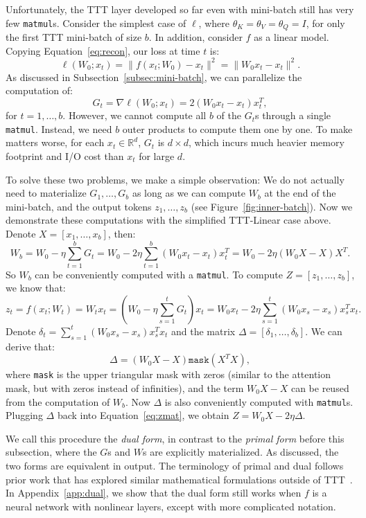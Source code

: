 \documentclass{article}
\newcommand{\R}{\mathbb{R}}
\begin{document}
Unfortunately, the TTT layer developed so far even with mini-batch still has very few \texttt{matmul}s.
Consider the simplest case of $\ell$, where $\theta_K = \theta_V = \theta_Q = I$, for only the first TTT mini-batch of size $b$.
In addition, consider $f$ as a linear model.
Copying Equation~\ref{eq:recon},
our loss at time $t$ is:
$$
\ell\left( W_0; x_t \right) = \|f(x_t; W_0) - x_t\|^2 
= \|W_0 x_t - x_t\|^2.
$$
As discussed in Subsection~\ref{subsec:mini-batch}, we can parallelize the computation of:
$$
G_t = \nabla \ell\left( W_0; x_t \right) = 2(W_0 x_t - x_t)x_t^T,
$$
for $t=1,\dots,b$.
However, we cannot compute all $b$ of the $G_t$s through a single \texttt{matmul}.
Instead, we need $b$ outer products to compute them one by one.
To make matters worse, for each $x_t\in \R^d$, $G_t$ is $d\times d$, which incurs much heavier memory footprint and I/O cost than $x_t$ for large $d$.

To solve these two problems, we make a simple observation: We do not actually need to materialize $G_1, \dots, G_b$ as long as we can compute $W_b$ at the end of the mini-batch, and the output tokens $z_1, \dots, z_b$ (see Figure~\ref{fig:inner-batch}).
Now we demonstrate these computations with the simplified TTT-Linear case above.
Denote $X = [x_1, \dots, x_b]$, then:
$$
W_b = W_0 - \eta\sum_{t=1}^b G_t
= W_0 - 2\eta\sum_{t=1}^b (W_0 x_t - x_t)x_t^T
= W_0 - 2\eta(W_0X - X)X^T.
$$
So $W_b$ can be conveniently computed with a \texttt{matmul}.
To compute $Z = [z_1, \dots, z_b]$, we know that:
\begin{equation}
\label{eq:zmat}
z_t = f(x_t; W_t) = W_tx_t = \left(W_0 - \eta \sum_{s=1}^t G_t\right)x_t
= W_0x_t - 2\eta \sum_{s=1}^t (W_0x_s - x_s)x_s^Tx_t.
\end{equation}
Denote $\delta_t = \sum_{s=1}^t (W_0x_s - x_s)x_s^Tx_t$ and the matrix $\Delta = [\delta_1, \dots, \delta_b]$.
We can derive that:
\begin{equation}
\Delta = \left( W_0X - X \right)\texttt{mask}\left( X^TX \right),
\end{equation}
where \texttt{mask} is the upper triangular mask with zeros (similar to the attention mask, but with zeros instead of infinities), and the term $W_0X - X$ can be reused from the computation of $W_b$.
Now $\Delta$ is also conveniently computed with \texttt{matmul}s. 
Plugging $\Delta$ back into Equation~\ref{eq:zmat}, we obtain $Z = W_0X - 2\eta\Delta$.

We call this procedure the \emph{dual form}, in contrast to the \emph{primal form} before this subsection, where the $G$s and $W$s are explicitly materialized.
As discussed, the two forms are equivalent in output. 
The terminology of primal and dual follows prior work that has explored similar mathematical formulations outside of TTT~\cite{irie2022dual, bishop2006pattern, rosenblatt1958perceptron}.
In Appendix~\ref{app:dual}, we show that the dual form still works when $f$ is a neural network with nonlinear layers, except with more complicated notation.
\end{document}
